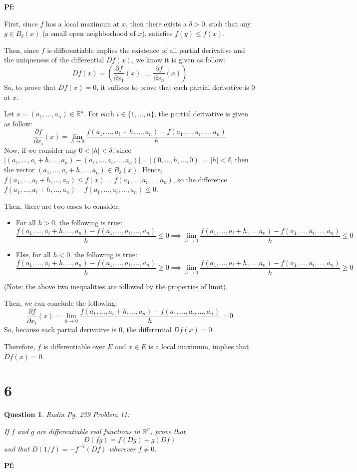\documentclass{article}
\newtheorem{question}{Question}
\begin{document}
\textbf{Pf:}

First, since $f$ has a local maximum at $x$, then there exists a $\delta>0$, such that any $y\in B_\delta(x)$ (a small open neighborhood of $x$),
satisfies $f(y)\leq f(x)$. 

Then, since $f$ is differentiable implies the existence of all partial derivative and the uniqueness of the differential $Df(x)$, we know it is given as follow:
$$Df(x)=\left(\frac{\partial f}{\partial x_1}(x),...,\frac{\partial f}{\partial x_n}(x)\right)$$
So, to prove that $Df(x)=0$, it suffices to prove that each partial derivative is $0$ at $x$.

\hfil

Let $x=(a_1,...,a_n)\in\mathbb{R}^n$. For each $i\in\{1,...,n\}$, the partial derivative is given as follow:
$$\frac{\partial f}{\partial x_i}(x)=\lim_{h\rightarrow 0}\frac{f(a_1,...,a_i+h,...,a_n)-f(a_1,...,a_i,...,a_n)}{h}$$
Now, if we consider any $0<|h|<\delta$, since $|(a_1,...,a_i+h,...,a_n)-(a_1,...,a_i,...,a_n)|=|(0,...,h,...,0)| = |h|<\delta$, then the vector $(a_1,...,a_i+h,...,a_n)\in B_\delta(x)$. 
Hence, $f(a_1,...,a_i+h,...,a_n) \leq f(x)=f(a_1,...,a_i,...,a_n)$, so the difference $f(a_1,...,a_i+h,...,a_n)-f(a_1,...,a_i,...,a_n)\leq 0$.

Then, there are two cases to consider:
\begin{itemize}
    \item For all $h>0$, the following is true:
    $$\frac{f(a_1,...,a_i+h,...,a_n)-f(a_1,...,a_i,...,a_n)}{h}\leq 0\implies \lim_{h\rightarrow 0}\frac{f(a_1,...,a_i+h,...,a_n)-f(a_1,...,a_i,...,a_n)}{h}\leq 0$$
    \item Else, for all $h<0$, the following is true:
    $$\frac{f(a_1,...,a_i+h,...,a_n)-f(a_1,...,a_i,...,a_n)}{h}\geq 0\implies \lim_{h\rightarrow 0}\frac{f(a_1,...,a_i+h,...,a_n)-f(a_1,...,a_i,...,a_n)}{h}\geq 0$$
\end{itemize}
(Note: the above two inequalities are followed by the properties of limit).

Then, we can conclude the following:
$$\frac{\partial f}{\partial x_i}(x)=\lim_{h\rightarrow 0}\frac{f(a_1,...,a_i+h,...,a_n)-f(a_1,...,a_i,...,a_n)}{h}=0$$
So, because each partial derivative is $0$, the differential $Df(x)=0$.

Therefore, $f$ is differentiable over $E$ and $x\in E$ is a local maximum, implies that $Df(x)=0$.

\break

\section*{6}
\begin{myBox}[]{}
    \begin{question}
        Rudin Pg. 239 Problem 11:

        If $f$ and $g$ are differentiable real functions in $\mathbb{R}^n$, prove that 
        $$D(fg)=f(Dg)+g(Df)$$
        and that $D(1/f)=-f^{-2}(Df)$ wherever $f\neq 0$.
    \end{question}
\end{myBox}

\textbf{Pf:}
\end{document}
